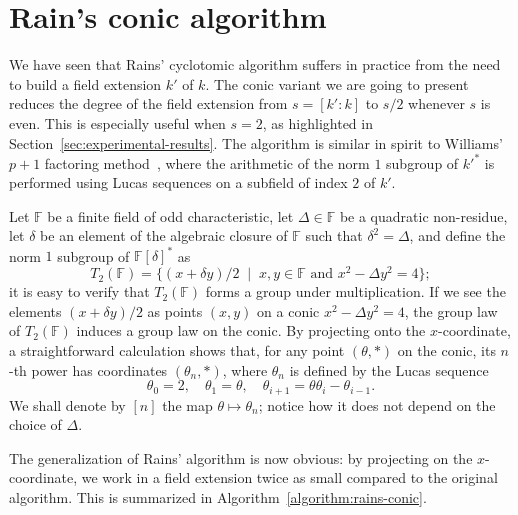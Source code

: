 \documentclass{mcom-l}
\theoremstyle{plain}
\theoremstyle{definition}
\newcommand{\F}{\ensuremath{\mathbb{F}}}
\newcounter{algorithm}
\begin{document}

\appendix


\section{Rain's conic algorithm}
\label{app:rains-vars}

We have seen that Rains' cyclotomic algorithm suffers in practice from
the need to build a field extension $k'$ of $k$. %
The conic variant we are going to present reduces the degree of the
field extension from $s=[k':k]$ to $s/2$ whenever $s$ is even. %
This is especially useful when $s=2$, as highlighted in
Section~\ref{sec:experimental-results}. %
The algorithm is similar in spirit to Williams' $p+1$ factoring
method~\cite{williams1982}, where the arithmetic of the norm $1$
subgroup of ${k'}^*$ is performed using Lucas sequences on a subfield
of index $2$ of $k'$.

Let $\F$ be a finite field of odd characteristic, let $\Delta\in\F$ be
a quadratic non-residue, let $\delta$ be an element of the algebraic
closure of $\F$ such that $\delta^2=\Delta$, and define the norm $1$
subgroup of $\F[\delta]^*$ as
\[T_2(\F) = \{(x+\delta y)/2 \;\mid\; x,y\in\F \text{ and } x^2-\Delta
  y^2 = 4\};\] %
it is easy to verify that $T_2(\F)$ forms a group under
multiplication. %
If we see the elements $(x+\delta y)/2$ as points $(x,y)$ on a conic
$x^2-\Delta y^2=4$, the group law of $T_2(\F)$ induces a group law on
the conic. %
By projecting onto the $x$-coordinate, a straightforward calculation
shows that, for any point $(\theta,*)$ on the conic, its $n$-th power
has coordinates $(\theta_n,*)$, where $\theta_n$ is defined by the
Lucas sequence
\[\theta_0 = 2, \quad \theta_1 = \theta, \quad \theta_{i+1}=\theta\theta_i-\theta_{i-1}.\] %
We shall denote by $[n]$ the map $\theta\mapsto\theta_n$; notice how
it does not depend on the choice of $\Delta$.

The generalization of Rains' algorithm is now obvious: by projecting
on the $x$-coordinate, we work in a field extension twice as small
compared to the original algorithm. %
This is summarized in Algorithm~\ref{algorithm:rains-conic}.
\end{document}
